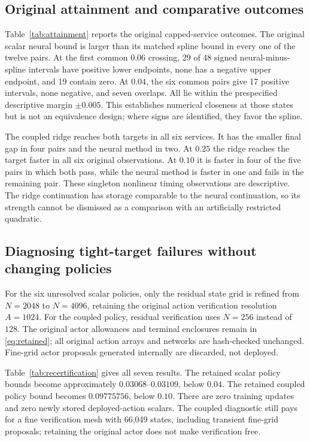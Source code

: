 \documentclass[ecta,nameyear,draft]{econsocart}
\begin{document}
\subsection{Original attainment and comparative outcomes}

Table~\ref{tab:attainment} reports the original capped-service outcomes. The original scalar neural bound is larger than its matched spline bound in every one of the twelve pairs. At the first common $0.06$ crossing, 29 of 48 signed neural-minus-spline intervals have positive lower endpoints, none has a negative upper endpoint, and 19 contain zero. At $0.04$, the six common pairs give 17 positive intervals, none negative, and seven overlaps. All lie within the prespecified descriptive margin $\pm0.005$. This establishes numerical closeness at those states but is not an equivalence design; where signs are identified, they favor the spline.

The coupled ridge reaches both targets in all six services. It has the smaller final gap in four pairs and the neural method in two. At $0.25$ the ridge reaches the target faster in all six original observations. At $0.10$ it is faster in four of the five pairs in which both pass, while the neural method is faster in one and fails in the remaining pair. These singleton nonlinear timing observations are descriptive. The ridge continuation has storage comparable to the neural continuation, so its strength cannot be dismissed as a comparison with an artificially restricted quadratic.

\subsection{Diagnosing tight-target failures without changing policies}

For the six unresolved scalar policies, only the residual state grid is refined from $N=2048$ to $N=4096$, retaining the original action verification resolution $A=1024$. For the coupled policy, residual verification uses $N=256$ instead of $128$. The original actor allowances and terminal enclosures remain in \eqref{eq:retained}; all original action arrays and networks are hash-checked unchanged. Fine-grid actor proposals generated internally are discarded, not deployed.

Table~\ref{tab:recertification} gives all seven results. The retained scalar policy bounds become approximately $0.03068$--$0.03109$, below $0.04$. The retained coupled policy bound becomes $0.09775756$, below $0.10$. There are zero training updates and zero newly stored deployed-action scalars. The coupled diagnostic still pays for a fine verification mesh with 66,049 states, including transient fine-grid proposals; retaining the original actor does not make verification free.
\end{document}
